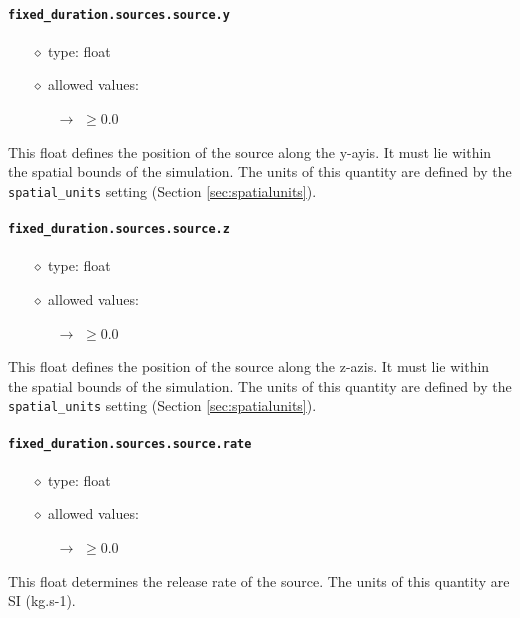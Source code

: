 \documentclass[]{article}
\def\code#1{\texttt{#1}}
\begin{document}
\paragraph{\code{fixed\_duration.sources.source.y}}\label{sec:fixsourcey}
\begin{itemize}
    \item[$\diamond$] type: float 
    \item[$\diamond$] allowed values:
    \begin{itemize}
        \item[$\rightarrow$] $\geq0.0$
    \end{itemize}
\end{itemize}
This float defines the position of the source along the y-ayis. It must lie
within the spatial bounds of the simulation. The units of this quantity are
defined by the \code{spatial\_units} setting (Section \ref{sec:spatialunits}).

\paragraph{\code{fixed\_duration.sources.source.z}}\label{sec:fixsourcez}
\begin{itemize}
    \item[$\diamond$] type: float 
    \item[$\diamond$] allowed values:
    \begin{itemize}
        \item[$\rightarrow$] $\geq0.0$
    \end{itemize}
\end{itemize}
This float defines the position of the source along the z-azis. It must lie
within the spatial bounds of the simulation. The units of this quantity are
defined by the \code{spatial\_units} setting (Section \ref{sec:spatialunits}).

\paragraph{\code{fixed\_duration.sources.source.rate}}\label{sec:fixsourcerate}
\begin{itemize}
    \item[$\diamond$] type: float 
    \item[$\diamond$] allowed values:
    \begin{itemize}
        \item[$\rightarrow$] $\geq0.0$
    \end{itemize}
\end{itemize}
This float determines the release rate of the source. The units of this quantity
are SI (kg.s-1).
\end{document}
